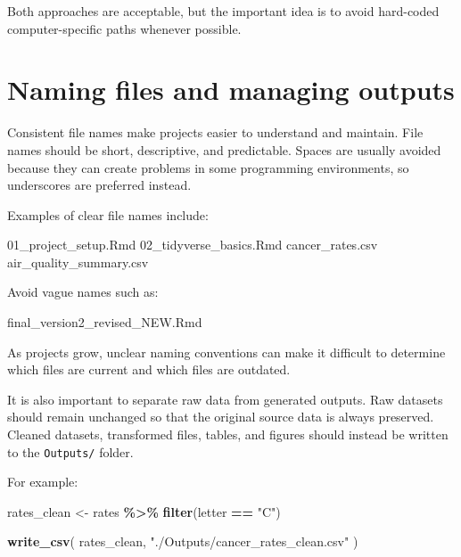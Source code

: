 \documentclass[
  11pt,
  oneside]{book}
\newenvironment{Shaded}{\begin{snugshade}}{\end{snugshade}}
\newcommand{\FunctionTok}[1]{\textcolor[rgb]{0.13,0.29,0.53}{\textbf{#1}}}
\newcommand{\NormalTok}[1]{#1}
\newcommand{\OtherTok}[1]{\textcolor[rgb]{0.56,0.35,0.01}{#1}}
\newcommand{\SpecialCharTok}[1]{\textcolor[rgb]{0.81,0.36,0.00}{\textbf{#1}}}
\newcommand{\StringTok}[1]{\textcolor[rgb]{0.31,0.60,0.02}{#1}}
\begin{document}
Both approaches are acceptable, but the important idea is to avoid hard-coded computer-specific paths whenever possible.

\section{Naming files and managing outputs}\label{naming-files-and-managing-outputs}

Consistent file names make projects easier to understand and maintain. File names should be short, descriptive, and predictable. Spaces are usually avoided because they can create problems in some programming environments, so underscores are preferred instead.

Examples of clear file names include:

\begin{Shaded}
\begin{Highlighting}[]
\NormalTok{01\_project\_setup.Rmd}
\NormalTok{02\_tidyverse\_basics.Rmd}
\NormalTok{cancer\_rates.csv}
\NormalTok{air\_quality\_summary.csv}
\end{Highlighting}
\end{Shaded}

Avoid vague names such as:

\begin{Shaded}
\begin{Highlighting}[]
\NormalTok{final\_version2\_revised\_NEW.Rmd}
\end{Highlighting}
\end{Shaded}

As projects grow, unclear naming conventions can make it difficult to determine which files are current and which files are outdated.

It is also important to separate raw data from generated outputs. Raw datasets should remain unchanged so that the original source data is always preserved. Cleaned datasets, transformed files, tables, and figures should instead be written to the \texttt{Outputs/} folder.

For example:

\begin{Shaded}
\begin{Highlighting}[]
\NormalTok{rates\_clean }\OtherTok{\textless{}{-}}\NormalTok{ rates }\SpecialCharTok{\%\textgreater{}\%}
  \FunctionTok{filter}\NormalTok{(letter }\SpecialCharTok{==} \StringTok{"C"}\NormalTok{)}

\FunctionTok{write\_csv}\NormalTok{(}
\NormalTok{  rates\_clean,}
  \StringTok{"./Outputs/cancer\_rates\_clean.csv"}
\NormalTok{)}
\end{Highlighting}
\end{Shaded}
\end{document}
